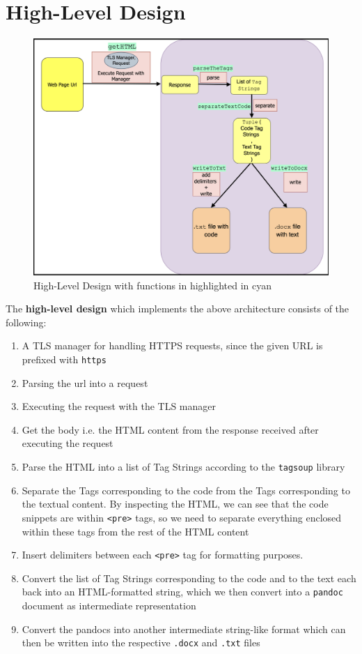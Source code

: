 \documentclass{scrreprt}
\begin{document}
\section{High-Level Design}


\begin{figure}[h]
    \centering
    \includegraphics[width=1.0\textwidth]{figures/high-design.png}
    \caption{High-Level Design with functions in highlighted in cyan}
    \label{fig:high-level-design}
\end{figure}

The \textbf{high-level design} which implements the above architecture consists of the following:
\begin{enumerate}
    \item A TLS manager for handling HTTPS requests, since the given URL is prefixed with \texttt{https}
    \item Parsing the url into a request
    \item Executing the request with the TLS manager
    \item Get the body i.e. the HTML content from the response received after executing the request
    \item Parse the HTML into a list of Tag Strings according to the \texttt{tagsoup} library
    \item Separate the Tags corresponding to the code from the Tags corresponding to the textual content. By inspecting the HTML, we can see that the code snippets are within \texttt{<pre>} tags, so we need to separate everything enclosed within these tags from the rest of the HTML content
    \item Insert delimiters between each \texttt{<pre>} tag for formatting purposes. 
    \item Convert the list of Tag Strings corresponding to the code and to the text each back into an HTML-formatted string, which we then convert into a \texttt{pandoc} document as intermediate representation
    \item Convert the pandocs into another intermediate string-like format which can then be written into the respective \texttt{.docx} and \texttt{.txt} files
\end{enumerate}
\end{document}
